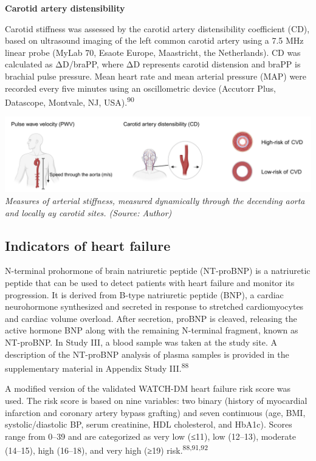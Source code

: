 \documentclass[
  a4paper,
  headsepline=true,
  open=any]{scrbook}
\begin{document}
\textbf{Carotid artery distensibility}

Carotid stiffness was assessed by the carotid artery distensibility
coefficient (CD), based on ultrasound imaging of the left common carotid
artery using a 7.5 MHz linear probe (MyLab 70, Esaote Europe,
Maastricht, the Netherlands). CD was calculated as ΔD/braPP, where ΔD
represents carotid distension and braPP is brachial pulse pressure. Mean
heart rate and mean arterial pressure (MAP) were recorded every five
minutes using an oscillometric device (Accutorr Plus, Datascope,
Montvale, NJ, USA).\textsuperscript{90}

\includegraphics{images/Methods_arterial_stiffness.pdf} \emph{Measures
of arterial stiffness, measured dynamically through the decending aorta
and locally ay carotid sites. (Source: Author)}

\hypertarget{indicators-of-heart-failure}{%
\subsection{Indicators of heart
failure}\label{indicators-of-heart-failure}}

N-terminal prohormone of brain natriuretic peptide (NT-proBNP) is a
natriuretic peptide that can be used to detect patients with heart
failure and monitor its progression. It is derived from B-type
natriuretic peptide (BNP), a cardiac neurohormone synthesized and
secreted in response to stretched cardiomyocytes and cardiac volume
overload. After secretion, proBNP is cleaved, releasing the active
hormone BNP along with the remaining N-terminal fragment, known as
NT-proBNP. In Study III, a blood sample was taken at the study site. A
description of the NT-proBNP analysis of plasma samples is provided in
the supplementary material in Appendix Study III.\textsuperscript{88}

A modified version of the validated WATCH-DM heart failure risk score
was used. The risk score is based on nine variables: two binary (history
of myocardial infarction and coronary artery bypass grafting) and seven
continuous (age, BMI, systolic/diastolic BP, serum creatinine, HDL
cholesterol, and HbA1c). Scores range from 0--39 and are categorized as
very low (≤11), low (12--13), moderate (14--15), high (16--18), and very
high (≥19) risk.\textsuperscript{88,91,92}
\end{document}
